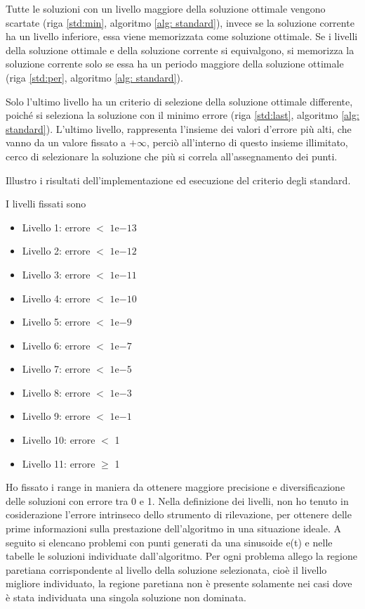 \documentclass[a4paper,12pt]{report}
\newcommand{\expnumber}[2]{{#1}\mathrm{e}{#2}}
\begin{document}
Tutte le soluzioni con un livello maggiore della soluzione ottimale vengono scartate (riga \ref{std:min}, algoritmo \ref{alg: standard}), invece se la soluzione corrente ha un livello inferiore, essa viene memorizzata come soluzione ottimale. Se i livelli della soluzione ottimale e della soluzione corrente si equivalgono, si memorizza la soluzione corrente solo se essa ha un periodo maggiore della soluzione ottimale (riga \ref{std:per}, algoritmo \ref{alg: standard}).

Solo l'ultimo livello ha un criterio di selezione della soluzione ottimale differente, poiché si seleziona la soluzione con il minimo errore (riga \ref{std:last}, algoritmo \ref{alg: standard}). L'ultimo livello,  rappresenta l'insieme dei valori d'errore più alti, che vanno da un valore fissato a $+\infty$, perciò all'interno di questo insieme illimitato, cerco di selezionare la soluzione che più si correla all'assegnamento dei punti.

Illustro i risultati dell'implementazione ed esecuzione del criterio degli standard.

I livelli fissati sono
\begin{itemize}
  \item Livello 1: errore $<$ $\expnumber{1}{-13}$
  \item Livello 2: errore $<$ $\expnumber{1}{-12}$
  \item Livello 3: errore $<$ $\expnumber{1}{-11}$
  \item Livello 4: errore $<$ $\expnumber{1}{-10}$
  \item Livello 5: errore $<$ $\expnumber{1}{-9}$
  \item Livello 6: errore $<$ $\expnumber{1}{-7}$
  \item Livello 7: errore $<$ $\expnumber{1}{-5}$
  \item Livello 8: errore $<$ $\expnumber{1}{-3}$
  \item Livello 9: errore $<$ $\expnumber{1}{-1}$
  \item Livello 10: errore $<$ 1
  \item Livello 11: errore $\geq$ 1
\end{itemize}

Ho fissato i range in maniera da ottenere maggiore precisione e diversificazione delle soluzioni con errore tra 0 e 1.
Nella definizione dei livelli, non ho tenuto in cosiderazione l'errore intrinseco dello strumento di rilevazione, per ottenere delle prime informazioni sulla prestazione dell'algoritmo in una situazione ideale. A seguito si elencano problemi con punti generati da una sinusoide e(t) e nelle tabelle le soluzioni individuate dall'algoritmo. Per ogni problema allego la regione paretiana corrispondente al livello della soluzione selezionata, cioè il livello migliore individuato, la regione paretiana non è presente solamente nei casi dove è stata individuata una singola soluzione non dominata.
\end{document}
